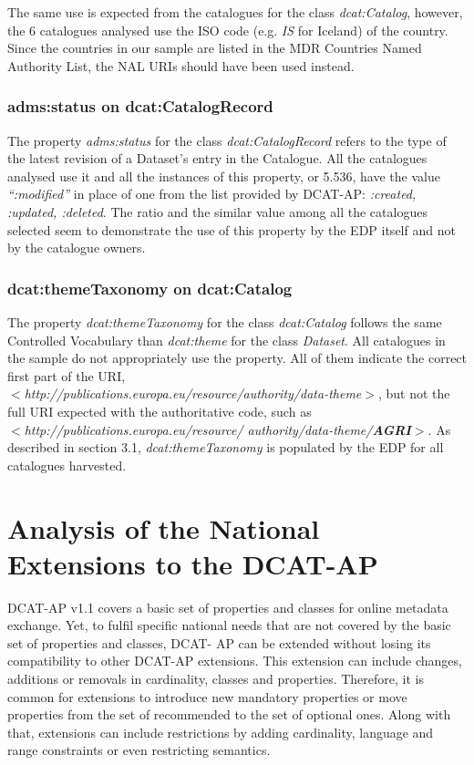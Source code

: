 \documentclass[<options>]{elsarticle}
\begin{document}
The same use is expected from the catalogues for the class \textit{dcat:Catalog}, however, the 6 catalogues analysed use the ISO code (e.g. \textit{IS} for Iceland) of the country.  Since the countries in our sample are listed in the MDR Countries Named Authority List, the NAL URIs should have been used instead.

\subsubsection{adms:status on dcat:CatalogRecord}
The property \textit{adms:status }for the class \textit{dcat:CatalogRecord} refers to the type of the latest revision of a Dataset's entry in the Catalogue. All the catalogues analysed use it and all the instances of this property, or 5.536, have the value \textit{“:modified”} in place of one from the list provided by DCAT-AP: \textit{:created, :updated, :deleted}. The ratio and the similar value among all the catalogues selected seem to demonstrate the use of this property by the EDP itself and not by the catalogue owners.

\subsubsection{dcat:themeTaxonomy on dcat:Catalog}

The property \textit{dcat:themeTaxonomy} for the class \textit{dcat:Catalog} follows the same Controlled Vocabulary than \textit{dcat:theme} for the class \textit{Dataset}. All catalogues in the sample do not appropriately use the property. All of them indicate the correct first part of the URI, \\
\textit{$<$http://publications.europa.eu/resource/authority/data-theme$>$}, but not the full URI expected with the authoritative code, such as \\ \textit{$<$http://publications.europa.eu/resource/ authority/data-theme/\textbf{AGRI}$>$}. As described in section 3.1, \textit{dcat:themeTaxonomy} is populated by the EDP for all catalogues harvested.

\section{Analysis of the National Extensions to the DCAT-AP} \label{NationalExtensions}
DCAT-AP v1.1 covers a basic set of properties and classes for online metadata exchange. Yet, to fulfil specific national needs that are not covered by the basic set of properties and classes, DCAT- AP can be extended without losing its compatibility to other DCAT-AP extensions. This extension can include changes, additions or removals in cardinality, classes and properties. Therefore, it is common for extensions to introduce new mandatory properties or move properties from the set of recommended to the set of optional ones. Along with that, extensions can include restrictions by adding cardinality, language and range constraints or even restricting semantics.
\end{document}
